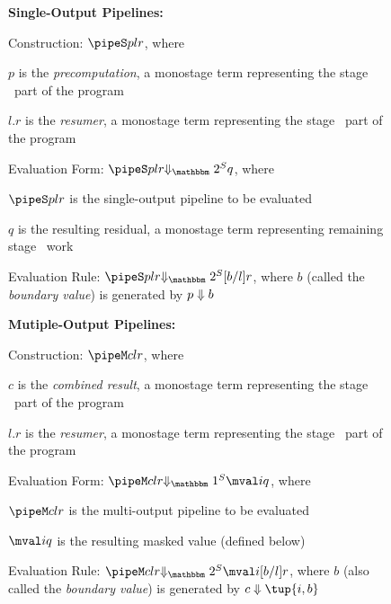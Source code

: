 \begin{figure*}
\begin{abstrsyn}

\textbf{Single-Output Pipelines:}

\hspace{2em} Construction: $\pipeS p l r$, where 
	
	\hspace{4em} $p$ is the {\em precomputation}, a monostage term representing the stage \bbone\ part of the program
	
	\hspace{4em} $l.r$ is the {\em resumer}, a monostage term representing the stage \bbtwo\ part of the program

\hspace{2em} Evaluation Form: $\sepredtwo {\pipeS p l r} q$, where 
	
	\hspace{4em} $\pipeS p l r$ is the single-output pipeline to be evaluated 
	
	\hspace{4em} $q$ is the resulting residual, a monostage term representing remaining stage \bbtwo\ work

\hspace{2em} Evaluation Rule: $\sepredtwo {\pipeS p l r} {[b/l]r}$, where $b$ (called the {\em boundary value}) is generated by ${p} \Downarrow {b}$

\textbf{Mutiple-Output Pipelines:}

\hspace{2em} Construction: $\pipeM c l r$, where 
	
	\hspace{4em} $c$ is the {\em combined result}, a monostage term representing the stage \bbone\ part of the program
	
	\hspace{4em} $l.r$ is the {\em resumer}, a monostage term representing the stage \bbtwo\ part of the program

\hspace{2em} Evaluation Form: $\sepredone {\pipeM c l r} {\mval i q}$, where 
	
	\hspace{4em} $\pipeM c l r$ is the multi-output pipeline to be evaluated
	
	\hspace{4em} $\mval i q$ is the resulting masked value (defined below)

\hspace{2em} Evaluation Rule: $\sepredtwo {\pipeM c l r} {\mval i {[b/l]r}}$, where $b$ (also called the {\em boundary value}) is generated by $\reduce c {\tup{i,b}}$


\end{abstrsyn}
\end{figure*}
